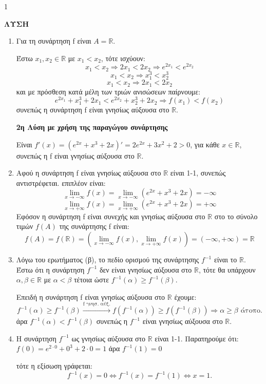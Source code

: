 \begin{ylh}{1}
    \item [Ύλη από εικόνα]
\end{ylh}
\textbf{ΛΥΣΗ}
\begin{enumerate}[label=\alph*)]
    \item Για τη συνάρτηση f είναι $A = \mathbb{R}$.

    Έστω $x_1, x_2 \in \mathbb{R}$ με $x_1 < x_2$, τότε ισχύουν:
    \[ x_1 < x_2 \Rightarrow 2x_1 < 2x_2 \Rightarrow e^{2x_1} < e^{2x_2} \]
    \[ x_1 < x_2 \Rightarrow x_1^3 < x_2^3 \]
    \[ x_1 < x_2 \Rightarrow 2x_1 < 2x_2 \]
    και με πρόσθεση κατά μέλη των τριών ανισώσεων παίρνουμε:
    \[ e^{2x_1} + x_1^3 + 2x_1 < e^{2x_2} + x_2^3 + 2x_2 \Rightarrow f(x_1) < f(x_2) \]
    συνεπώς η συνάρτηση f είναι γνησίως αύξουσα στο $\mathbb{R}$.

    \textbf{2η Λύση με χρήση της παραγώγου συνάρτησης}

    Είναι $f'(x) = (e^{2x} + x^3 + 2x)' = 2e^{2x} + 3x^2 + 2 > 0$, για κάθε $x \in \mathbb{R}$, συνεπώς η f είναι γνησίως αύξουσα στο $\mathbb{R}$.

    \item Αφού η συνάρτηση f είναι γνησίως αύξουσα στο $\mathbb{R}$ είναι 1-1, συνεπώς αντιστρέφεται.
    επιπλέον είναι:
    \[ \lim_{x \to -\infty} f(x) = \lim_{x \to -\infty} (e^{2x} + x^3 + 2x) = -\infty \]
    \[ \lim_{x \to +\infty} f(x) = \lim_{x \to +\infty} (e^{2x} + x^3 + 2x) = +\infty \]
    Εφόσον η συνάρτηση f είναι συνεχής και γνησίως αύξουσα στο $\mathbb{R}$ στο το σύνολο τιμών $f(A)$ της συνάρτησης f είναι:
    \[ f(A) = f(\mathbb{R}) = \left( \lim_{x \to -\infty} f(x), \lim_{x \to +\infty} f(x) \right) = (-\infty, +\infty) = \mathbb{R} \]

    \item Λόγω του ερωτήματος (β), το πεδίο ορισμού της συνάρτησης $f^{-1}$ είναι το $\mathbb{R}$. Έστω ότι η συνάρτηση $f^{-1}$ δεν είναι γνησίως αύξουσα στο $\mathbb{R}$, τότε θα υπάρχουν $\alpha, \beta \in \mathbb{R}$ με $\alpha < \beta$ τέτοια ώστε $f^{-1}(\alpha) \geq f^{-1}(\beta)$.

    Επειδή η συνάρτηση f είναι γνησίως αύξουσα στο $\mathbb{R}$ έχουμε:
    \[ f^{-1}(\alpha) \geq f^{-1}(\beta) \xrightarrow{\text{f γνησ. αύξ.}} f(f^{-1}(\alpha)) \geq f(f^{-1}(\beta)) \Rightarrow \alpha \geq \beta \text{ άτοπο.} \]
    άρα $f^{-1}(\alpha) < f^{-1}(\beta)$ συνεπώς η $f^{-1}$ είναι γνησίως αύξουσα στο $\mathbb{R}$.

    \item Η συνάρτηση $f^{-1}$ ως γνησίως αύξουσα στο $\mathbb{R}$ είναι 1-1. Παρατηρούμε ότι:
    $f(0) = e^{2 \cdot 0} + 0^3 + 2 \cdot 0 = 1$ άρα $f^{-1}(1) = 0$

    τότε η εξίσωση γράφεται:
    \[ f^{-1}(x) = 0 \Leftrightarrow f^{-1}(x) = f^{-1}(1) \Leftrightarrow x = 1. \]
\end{enumerate}